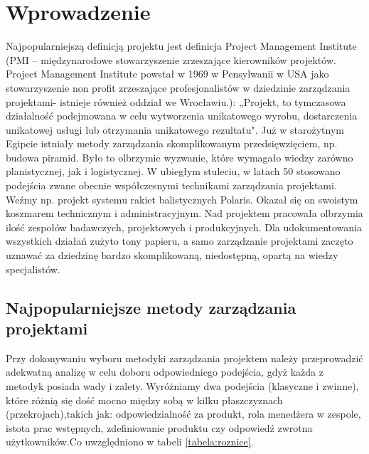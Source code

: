 
\chapter{Wprowadzenie}

Najpopularniejszą definicją projektu jest definicja Project Management Institute (PMI – międzynarodowe stowarzyszenie zrzeszające kierowników projektów. Project Management Institute powstał w 1969 w Pensylwanii w USA jako stowarzyszenie non profit zrzeszające profesjonalistów w dziedzinie zarządzania projektami- istnieje również oddział we Wrocławiu.): „Projekt, to tymczasowa działalność podejmowana w celu wytworzenia unikatowego wyrobu, dostarczenia unikatowej usługi lub otrzymania unikatowego rezultatu".\cite{PMI_2000} Już w starożytnym Egipcie istniały metody zarządzania skomplikowanym przedsięwzięciem, np. budowa piramid. Było to olbrzymie wyzwanie, które wymagało wiedzy zarówno planistycznej, jak i logistycznej. W ubiegłym stuleciu, w latach 50 stosowano podejścia zwane obecnie współczesnymi technikami zarządzania projektami. Weźmy np. projekt systemu rakiet balistycznych Polaris. Okazał się on swoistym koszmarem technicznym i administracyjnym. Nad projektem pracowała olbrzymia ilość zespołów badawczych, projektowych i produkcyjnych. Dla udokumentowania wszystkich działań zużyto tony papieru, a samo zarządzanie projektami zaczęto uznawać za dziedzinę bardzo skomplikowaną, niedostępną, opartą na wiedzy specjalistów.\cite{Stanley_2013}

\section{Najpopularniejsze metody zarządzania projektami}
Przy dokonywaniu wyboru metodyki zarządzania projektem należy przeprowadzić adekwatną analizę w celu doboru odpowiedniego podejścia, gdyż każda z metodyk posiada wady i zalety. Wyróżniamy dwa podejścia (klasyczne i zwinne), które różnią się dość mocno między sobą w kilku płaszczyznach (przekrojach),takich jak: odpowiedzialność za produkt, rola menedżera w zespole, istota prac wstępnych, zdefiniowanie produktu czy odpowiedź zwrotna użytkowników.Co uwzględniono w tabeli \ref{tabela:roznice}.

